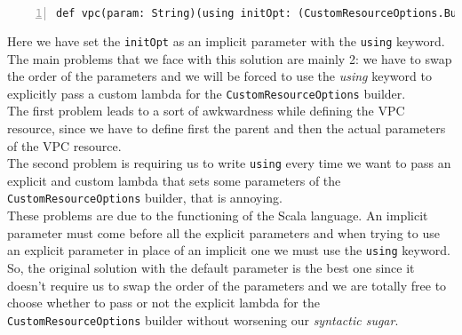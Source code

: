 \begin{minipage}{\linewidth}
\begin{lstlisting}[numbers=left, numberstyle=\tiny, numbersep=-5pt, stepnumber=1]
  def vpc(param: String)(using initOpt: (CustomResourceOptions.Builder ?=> Unit), init: VpcArgs.Builder ?=> Unit) : etc.
\end{lstlisting}
\end{minipage}
Here we have set the \texttt{initOpt} as an implicit parameter with the \texttt{using} keyword.
The main problems that we face with this solution are mainly 2: we have to swap the order of the parameters and we will be forced to use the \textit{using} keyword to explicitly pass a custom lambda for the \texttt{CustomResourceOptions} builder.\\
The first problem leads to a sort of awkwardness while defining the VPC resource, since we have to define first the parent and then the actual parameters of the VPC resource.\\
The second problem is requiring us to write \texttt{using} every time we want to pass an explicit and custom lambda that sets some parameters of the \texttt{CustomResourceOptions} builder, that is annoying.\\
These problems are due to the functioning of the Scala language.
An implicit parameter must come before all the explicit parameters and when trying to use an explicit parameter in place of an implicit one we must use the \texttt{using} keyword.
So, the original solution with the default parameter is the best one since it doesn't require us to swap the order of the parameters and we are totally free to choose whether to pass or not the explicit lambda for the \texttt{CustomResourceOptions} builder without worsening our \textit{syntactic sugar}.


